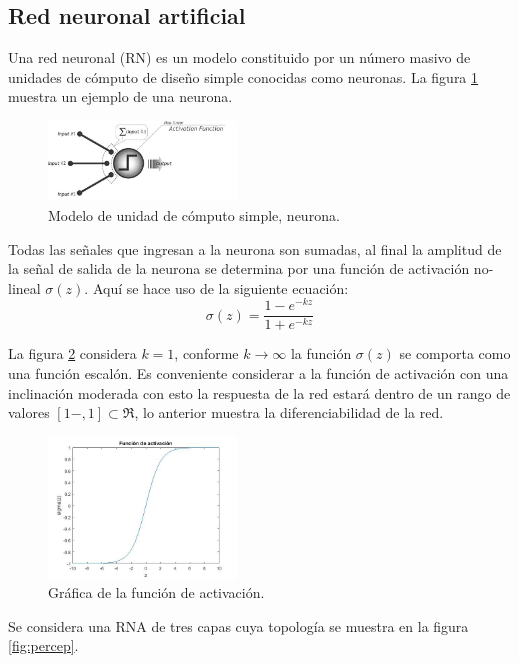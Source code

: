 \subsection{Red neuronal artificial}
Una red neuronal (RN) es un modelo constituido por un n\'umero masivo de unidades de c\'omputo de dise\~no simple conocidas como neuronas. La figura \ref{fig:neurona}  muestra un ejemplo de una neurona.

\begin{figure}[H]
	\centering
	\includegraphics[width=5cm]{img/neurona.jpg}
	\caption{Modelo de unidad de c\'omputo simple, neurona.}
	\label{fig:neurona}
\end{figure}

Todas las se\~nales que ingresan a la neurona son sumadas, al final la amplitud de la se\~nal de salida de la neurona se determina por una funci\'on de activaci\'on no-lineal $\sigma(z)$. Aqu\'i se hace uso de la siguiente ecuaci\'on: 
\begin{equation} \sigma(z)=\frac{1-e^{-kz}}{1+e^{-kz}} \end{equation}

La figura \ref{fig:activa} considera $k=1$, conforme $k\rightarrow\infty$ la funci\'on $\sigma(z)$ se comporta como una funci\'on escal\'on. Es conveniente considerar a la funci\'on de activaci\'on con una inclinaci\'on moderada con esto la respuesta de la red estar\'a dentro de un rango de valores $\left[1-,1\right]\subset\Re$, lo anterior muestra la diferenciabilidad de la red.

\begin{figure}[H]
	\centering
	\includegraphics[width=5cm]{img/activa.jpg}
	\caption{Gr\'afica de  la funci\'on de activaci\'on.}
	\label{fig:activa}
\end{figure}

Se considera una RNA de tres capas cuya topolog\'ia se muestra en la figura \ref{fig:percep}.  

